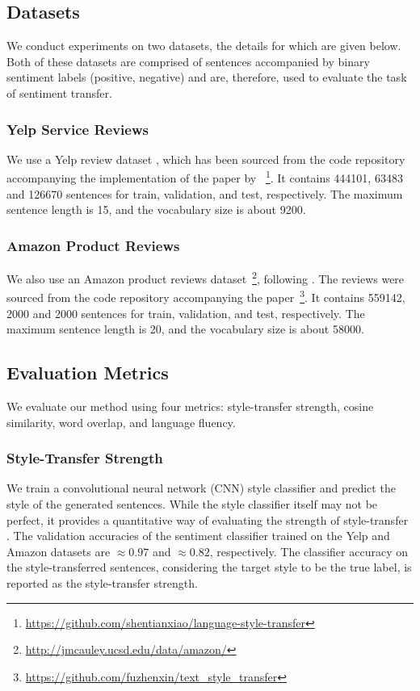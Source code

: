 \documentclass[letterpaper]{article} %
\newcommand{\citeay}[1]{\citeauthor{#1} \shortcite{#1}}
\begin{document}
\subsection{Datasets}

We conduct experiments on two datasets, the details for which are given below.
Both of these datasets are comprised of sentences accompanied by binary sentiment labels (positive, negative) and are, therefore, used to evaluate the task of sentiment transfer.

\subsubsection{Yelp Service Reviews}

We use a Yelp review dataset \cite{challenge2013yelp}, which has been sourced from the code repository accompanying the implementation of the paper by \citeay{shen2017style}~\footnote{\url{https://github.com/shentianxiao/language-style-transfer}}.
It contains 444101, 63483 and 126670 sentences for train, validation, and test, respectively.
The maximum sentence length is 15, and the vocabulary size is about 9200.

\subsubsection{Amazon Product Reviews}

We also use an Amazon product reviews dataset~\footnote{\url{http://jmcauley.ucsd.edu/data/amazon/}}, following \citeay{fu2017style}.
The reviews were sourced from the code repository accompanying the paper~\footnote{\url{https://github.com/fuzhenxin/text_style_transfer}}.
It contains 559142, 2000 and 2000 sentences for train, validation, and test, respectively.
The maximum sentence length is 20, and the vocabulary size is about 58000.

\subsection{Evaluation Metrics}

We evaluate our method using four metrics: style-transfer strength, cosine similarity, word overlap, and language fluency.

\subsubsection{Style-Transfer Strength}
We train a convolutional neural network (CNN) style classifier \cite{kim2014convolutional} and predict the style of the generated sentences.
While the style classifier itself may not be perfect, it provides a quantitative way of evaluating the strength of style-transfer \cite{hu2017toward,shen2017style,fu2017style}.
The validation accuracies of the sentiment classifier trained on the Yelp and Amazon datasets are $\approx 0.97$ and $\approx 0.82$, respectively.
The classifier accuracy on the style-transferred sentences, considering the target style to be the true label, is reported as the style-transfer strength.
\end{document}
